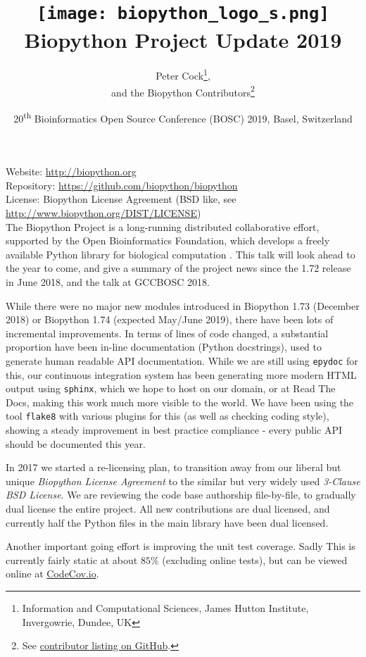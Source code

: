 \documentclass[10pt,oneside]{article}
\title{%
\vspace{-1.5in}
\texttt{[image: biopython\_logo\_s.png]} \\
\vspace{3mm}Biopython Project Update 2019}
\author{
    Peter Cock\thanks{Information and Computational Sciences, James Hutton Institute, Invergowrie, Dundee, UK},\\
    and the Biopython Contributors\thanks{See \href{https://github.com/biopython/biopython/blob/master/CONTRIB.rst}{contributor listing on GitHub}.}}
\date{20\textsuperscript{th} Bioinformatics Open Source Conference (BOSC) 2019, Basel, Switzerland}
\begin{document}
\maketitle
\thispagestyle{empty}

\vspace{-0.2in}
\noindent
Website: \url{http://biopython.org} \\
Repository: \url{https://github.com/biopython/biopython} \\
License: Biopython License Agreement (BSD like, see \url{http://www.biopython.org/DIST/LICENSE}) \\

The Biopython Project is a long-running distributed collaborative effort,
supported by the Open Bioinformatics Foundation, which develops a freely
available Python library for biological computation \cite{AppNote}. This
talk will look ahead to the year to come, and give a summary of the project
news since the 1.72 release in June 2018, and the talk at GCCBOSC 2018.

While there were no major new modules introduced in Biopython 1.73
(December 2018) or Biopython 1.74 (expected May/June 2019), there have
been lots of incremental improvements.
In terms of lines of code changed, a substantial proportion have been
in-line documentation (Python docstrings), used to generate human readable
API documentation. While we are still using \texttt{epydoc} for this, our continuous
integration system has been generating more modern HTML output using \texttt{sphinx},
which we hope to host on our domain, or at Read The Docs, making this work
much more visible to the world. We have been using the tool \texttt{flake8}
with various plugins for this (as well as checking coding style), showing
a steady improvement in best practice compliance - every public API should
be documented this year.

In 2017 we started a re-licensing plan, to transition away
from our liberal but unique \emph{Biopython License Agreement} to the similar
but very widely used \emph{3-Clause BSD License}. We are reviewing the code
base authorship file-by-file, to gradually dual license the entire project.
All new contributions are dual licensed, and currently half the Python files
in the main library have been dual licensed.

Another important going effort is improving the unit test coverage. Sadly
This is currently fairly static at about $85\%$ (excluding online tests),
but can be viewed online at
\href{https://codecov.io/github/biopython/biopython/}{CodeCov.io}.
\end{document}
